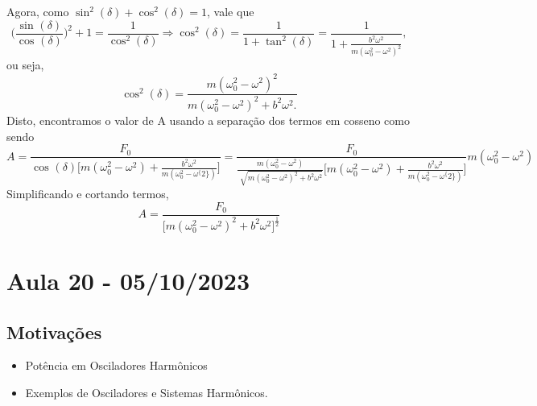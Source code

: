 \documentclass{article}
\begin{document}
Agora, como \(\sin^{2}{(\delta )} + \cos^{2}{(\delta )} = 1\), vale que 
  \[
    \biggl(\frac{\sin^{}{(\delta )}}{\cos^{}{(\delta )}}\biggr)^{2} + 1 = \frac{1}{\cos^{2}{(\delta )}} \Rightarrow \cos^{2}{(\delta )} = \frac{1}{1+\tan^{2}{(\delta )}} = \frac{1}{1+\frac{b^{2}\omega ^{2}}{m(\omega_{0}^{2}-\omega ^{2})^{2}}},
  \]
ou seja, 
  \[
    \cos^{2}{(\delta )} = \frac{m(\omega_{0}^{2}-\omega ^{2})^{2}}{m(\omega_{0}^{2}-\omega ^{2})^{2}+b^{2}\omega ^{2}.}
  \]
Disto, encontramos o valor de A usando a separação dos termos em cosseno como sendo 
  \[
    A = \frac{F_{0}}{\cos^{}{(\delta )}\biggl[m(\omega_{0}^{2}-\omega ^{2})+\frac{b^{2}\omega ^{2}}{m(\omega_{0}^{2}-\omega ^\{2\})}\biggr]} = \frac{F_{0}}{\frac{m(\omega_{0}^{2}-\omega ^{2})}{\sqrt[]{m(\omega_{0}^{2}-\omega ^{2})^{2}+b^{2}\omega ^{2}}}\biggl[m(\omega_{0}^{2}-\omega ^{2})+\frac{b^{2}\omega ^{2}}{m(\omega_{0}^{2}-\omega ^\{2\})}\biggr]}m(\omega_{0}^{2}-\omega ^{2})
  \]
Simplificando e cortando termos, 
  \[
    A = \frac{F_{0}}{\biggl[m(\omega_{0}^{2}-\omega ^{2})^{2}+b^{2}\omega ^{2}\biggr]^{\frac{1}{2}}}
  \]
\newpage

\section{Aula 20 - 05/10/2023}
\subsection{Motivações}
\begin{itemize}
  \item Potência em Osciladores Harmônicos
  \item Exemplos de Osciladores e Sistemas Harmônicos.
\end{itemize}
\end{document}
